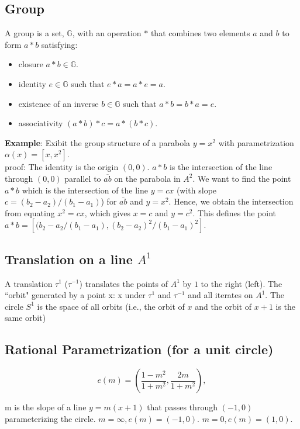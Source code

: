 \documentclass[12pt]{article}
\begin{document}
\subsection{Group}
A group is a set, $\mathbb{G}$, with an operation $*$ that combines two elements $a$ and $b$ to form $a*b$ satisfying:
\begin{itemize}
   \item closure $a*b \in \mathbb{G}$. 
   \item identity $e \in \mathbb{G}$ such that $e*a = a*e = a$. 
   \item existence of an inverse $b \in \mathbb{G}$ such that $a*b = b*a = e$. 
   \item associativity $(a*b)*c = a*(b*c)$. 
\end{itemize}

{\bf Example}: Exibit the group structure of a parabola $y= x^2$ with parametrization $\alpha(x)= [x,x^2]$. \\
proof:
The identity is the origin $(0,0)$.
$a*b$ is the intersection of the line through $(0,0)$ parallel to $\overline{ab}$ on the parabola in $A^2$.
We want to find the point $a*b$ which is the intersection of the line $y=cx$ (with slope $c=(b_2-a_2)/(b_1-a_1)$) for $\overline{ab}$ and $y=x^2$.
Hence, we obtain the intersection from equating $x^2=cx$, which gives $x=c$ and $y=c^2$.
This defines the point $a*b = [(b_2-a_2/(b_1-a_1),(b_2-a_2)^2/(b_1-a_1)^2]$.

\subsection{Translation on a line $A^1$}
A translation $\tau^1$ ($\tau^{-1}$) translates the points of $A^1$ by $1$ to the right (left).
The ``orbit" generated by a point x: x under $\tau^1$ and $\tau^{-1}$ and all iterates on $A^1$.
The circle $S^1$ is the space of all orbits (i.e., the orbit of $x$ and the orbit of $x+1$ is the same orbit)

\subsection{Rational Parametrization (for a unit circle)}

\begin{equation}
   e(m) = ( \frac{1-m^2}{1+m^2}, \frac{2m}{1+m^2} ),
\end{equation}

m is the slope of a line $y=m(x+1)$ that passes through $(-1,0)$ parameterizing the circle.
$m=\infty, e(m) = (-1,0)$. 
$m=0, e(m)=(1,0)$.
\end{document}
